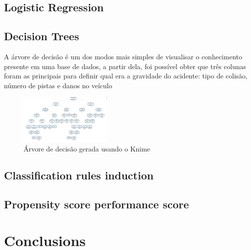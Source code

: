 \documentclass[conference]{IEEEtran}
\begin{document}
\subsection{Logistic Regression}



\subsection{Decision Trees}

A árvore de decisão é um dos modos mais simples de visualisar o conhecimento presente em uma 
base de dados, a partir dela, foi possível obter que três colunas foram as principais para definir qual
era a gravidade do acidente: tipo de colisão, número de pistas e danos no veículo
\begin{figure}[H]
\centerline{\includegraphics[width=0.4\textwidth]{Images/decision-tree.png}}
\caption{\label{fig:decision-tree} Árvore de decisão gerada usando o Knime}
\end{figure}


\subsection{Classification rules induction}
\subsection{Propensity score performance score}


\section{Conclusions}



\end{document}
